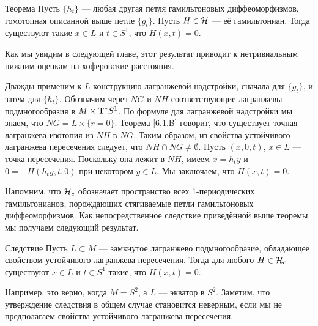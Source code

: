 \begin{thm}{Теорема}\label{6.3.A}
Пусть $\{h_t\}$ — любая другая петля гамильтоновых диффеоморфизмов, гомотопная описанной выше петле $\{g_t\}$.
Пусть $H \in \mathcal{H}$ — её гамильтониан.
Тогда существуют такие $x \in L$ и $t \in S^1$, что $H (x, t) = 0$.
\end{thm}

Как мы увидим в следующей главе, этот результат приводит к нетривиальным нижним оценкам на хоферовские расстояния.

Дважды применим к $L$ конструкцию лагранжевой надстройки, сначала для $\{g_t\}$, и затем для $\{h_t\}$.
Обозначим через $NG$ и $NH$ соответствующие лагранжевы подмногообразия в $M \times \mathrm{T}^\ast S^1$.
По формуле для лагранжевой надстройки мы знаем, что $NG = L \times \{r = 0\}$.
Теорема \ref{6.1.B} говорит, что существует точная лагранжева
изотопия из $NH$ в $NG$. 
Таким образом, из свойства устойчивого лагранжева пересечения следует,
что $NH \cap NG \ne \emptyset$. 
Пусть $(x, 0, t)$, $x \in L$ — точка пересечения.
Поскольку она лежит в $NH$, имеем $x = h_t y$ и $0 = -H (h_t y, t, 0)$
при некотором $y \in L$. 
Мы заключаем, что $H (x, t) = 0$.
\qeds

Напомним, что $\mathcal{H}_c$ обозначает пространство всех 1-периодических
гамильтонианов, порождающих стягиваемые петли гамильтоновых
диффеоморфизмов. 
Как непосредственное следствие приведённой выше теоремы мы получаем
следующий результат. 

\begin{thm}{Следствие}\label{6.3.B}
Пусть $L \subset M$ — замкнутое лагранжево подмногообразие,
обладающее свойством устойчивого лагранжева пересечения. 
Тогда для любого $H \in \mathcal{H}_c$ существуют $x \in L$ и $t \in S^1$ такие, что $H (x, t) = 0$.
\end{thm}


Например, это верно, когда $M = S^2$, а $L$ — экватор в $S^2$.
Заметим, что утверждение следствия в общем случае становится неверным,
если мы не предполагаем свойства устойчивого лагранжева пересечения.

